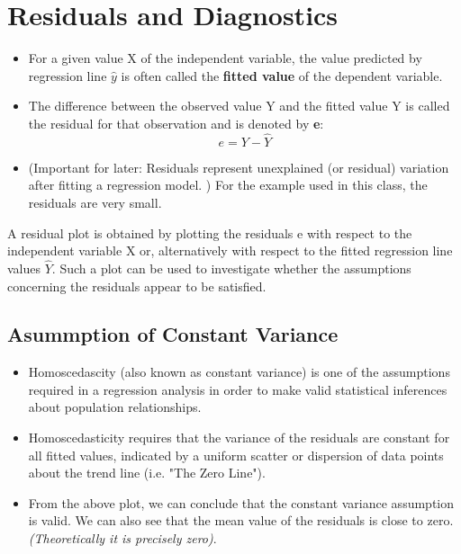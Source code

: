 
\section{Residuals and Diagnostics}
\begin{itemize}
\item For a given value X of the independent variable, the value predicted by regression line $\hat{y}$ is often called the \textbf{fitted
	value} of the dependent variable. 
\item The difference between the observed value Y and the fitted value Y
is called the residual for that observation and is denoted by \textbf{e}:
\[e= Y-\hat{Y}\]

\item (Important for later: Residuals represent unexplained (or residual) variation after fitting a regression
model. )
For the example used in this class, the residuals are very small.
\end{itemize}



A residual plot is obtained by plotting the residuals e with respect to the independent variable X or,
alternatively with respect to the fitted regression line values $\hat{Y}$. Such a plot can be used to
investigate whether the assumptions concerning the residuals appear to be satisfied.

\subsection{Asummption of Constant Variance}
\begin{itemize}
\item Homoscedascity (also known as constant variance) is one of the assumptions required in a
regression analysis in order to make valid statistical inferences about population relationships.

\item Homoscedasticity requires that the variance of the residuals are constant for all fitted values,
indicated by a uniform scatter or dispersion of data points about the trend line (i.e. "The Zero Line").
\item From the above plot, we can conclude that the constant variance assumption is valid. We can also
see that the mean value of the residuals is close to zero. \textit{(Theoretically it is precisely zero)}.
\end{itemize}

